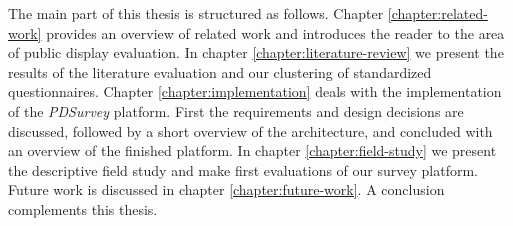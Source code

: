 	The main part of this thesis is structured as follows. Chapter \ref{chapter:related-work} provides an overview of related work and introduces the reader to the area of public display evaluation. In chapter \ref{chapter:literature-review} we present the results of the literature evaluation and our clustering of standardized questionnaires. Chapter \ref{chapter:implementation} deals with the implementation of the \textit{PDSurvey} platform. First the requirements and design decisions are discussed, followed by a short overview of the architecture, and concluded with an overview of the finished platform. In chapter \ref{chapter:field-study} we present the descriptive field study and make first evaluations of our survey platform. Future work is discussed in chapter \ref{chapter:future-work}. A conclusion complements this thesis.













